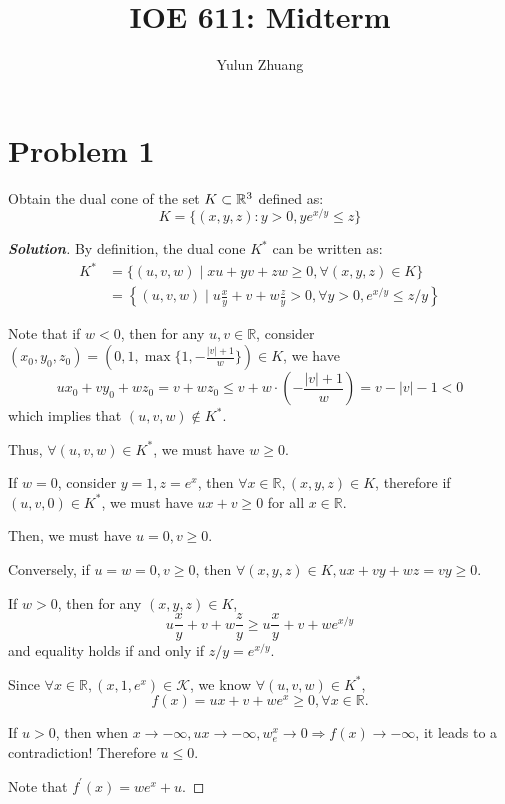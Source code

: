 \documentclass[11pt]{article}
\newenvironment{solution}
  {\renewcommand\qedsymbol{$\square$}\begin{proof}[\textbf{Solution}]}
  {\end{proof}}
\begin{document}
\title{IOE 611: Midterm}
\author{Yulun Zhuang}
\maketitle
\section*{Problem 1}
Obtain the dual cone of the set $K \subset {{\mathbb{R}}}^3$ defined as:
\[
K = \{(x, y, z):y>0, ye^{x/y} \leq z\}
\]

\begin{solution}
By definition, the dual cone $K^*$ can be written as:
$$
\begin{aligned}
{K}^* & =\{(u, v, w) \mid  x u+y v+z w \geq 0, \forall(x, y, z) \in K\} \\
& =\left\{(u, v, w) \mid  u \frac{x}{y}+v+w \frac{z}{y}>0, \forall y>0, e^{x / y} \leq z / y\right\}
\end{aligned}
$$

Note that if $w<0$, then for any $u, v \in \mathbb{R}$, consider $\left(x_0, y_0,  z_0\right)=(0, 1, \max \{1,-\frac{|v|+1}{w}\}) \in K$, we have
\[
u x_0+v y_0+w z_0=v+w z_0 \leq v+w \cdot\left(-\frac{|v|+1}{w}\right)=v-|v|-1<0
\]
which implies that $(u, v, w)\notin K^*$.

Thus, $\forall(u, v, w) \in {K}^*$, we must have $w \geq 0$.

If $w=0$, consider $y=1, z=e^x$, then $\forall x \in \mathbb{R},(x, y, z) \in K$, therefore if $(u, v, 0) \in K^*$, we must have $u x+v \geq 0$ for all $x \in \mathbb{R}$. 

Then, we must have $u=0, v \geq 0$.

Conversely, if $u=w=0, v\geq 0$, then $\forall(x, y, z) \in {K},  u x+v y+w z=v y \geq 0$.

If $w > 0$, then for any $(x, y, z) \in K$,
$$
u \frac{x}{y}+v+w \frac{z}{y} \geq u \frac{x}{y}+v+w e^{x / y}
$$
and equality holds if and only if $z / y=e^{x / y}$.

Since $\forall x \in \mathbb{R},\left(x, 1, e^x\right) \in \mathcal{K}$, we know $\forall(u, v, w) \in K^*$,
$$
f(x)=u x+v+w e^x \geq 0, \forall x \in \mathbb{R} .
$$


If $u>0$, then when $x \rightarrow -\infty, u x \rightarrow-\infty, w_e^x \rightarrow 0 \Rightarrow f(x) \rightarrow-\infty$, it leads to a contradiction! Therefore $u \leq 0$. 

Note that $f^{\prime}(x)=w e^x+u$.


\end{solution}
\end{document}
